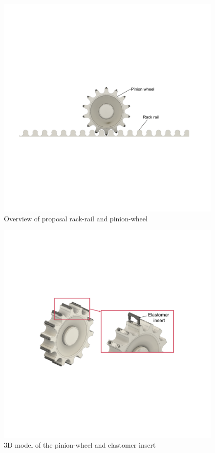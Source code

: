 \begin{figure}[tb]
  \centering
  \includegraphics[width=\columnwidth]{./figure/rack-pinion-v2.pdf}
  \caption{Overview of proposal rack-rail and pinion-wheel}
  \label{fig:rack-pinion-concept}
\end{figure}


\begin{figure}[tb]
  \centering
  \includegraphics[width=.8\columnwidth]{figure/elastomer-insert-v2.pdf}
  \caption{3D model of the pinion-wheel and elastomer insert}
  \label{fig:pinion-wheel-edited}
\end{figure}


